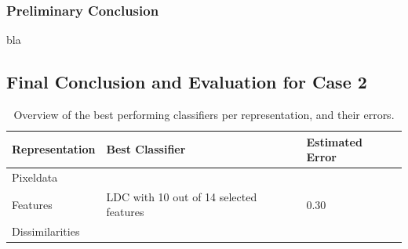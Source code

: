 \subsubsection*{Preliminary Conclusion}
bla

\subsection{Final Conclusion and Evaluation for Case 2}
\begin{table}[H]
	\centering
	\caption{Overview of the best performing classifiers per representation, and their errors.}
	\label{tab:concase1}
	\begin{tabular}{l|ll}
		Representation  & Best Classifier               & Estimated Error \\ \hline
		Pixeldata       &  &           \\
		Features        & LDC with 10 out of 14 selected features                      & 0.30          \\
		Dissimilarities &                            &          
	\end{tabular}
\end{table}